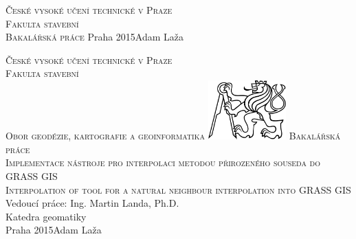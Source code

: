 \begin{center}
\newcommand{\napisCVUT}{České vysoké učení technické v Praze}
\newcommand{\napisFS}{Fakulta stavební}
\newcommand{\napisObor}{Obor geodézie, kartografie a geoinformatika}
\newcommand{\napisKatedra}{Katedra geomatiky}
\newcommand{\napisVedouci}{Vedoucí práce: Ing. Martin Landa, Ph.D.}
\newcommand{\napisAutor}{Adam Laža}
\newcommand{\napisDatum}{Praha 2015}
\newcommand{\napisNazevI}{Implementace nástroje pro interpolaci metodou přirozeného souseda do GRASS GIS}
\newcommand{\napisNazevAjI}{Interpolation of tool for a natural neighbour interpolation into GRASS GIS}
\newcommand{\napisBakalarka}{Bakalářská práce}
\newcommand{\napisPraha}{Praha 2015}
%
\newcommand{\velka}[1]{\textsc{#1}}
%
% 
\newif\ifpatitul
\patitultrue

\ifpatitul
{\Large\velka{\napisCVUT}}\\
\velka{\Large\napisFS}\\
\vfill
{\LARGE\velka{\napisBakalarka}}
\vfill
{\large\napisPraha\hfill\napisAutor}
\newpage
\fi%


{\Large\velka{\napisCVUT}}\\
{\Large\velka{\napisFS}}\\
{\Large\velka{\napisObor}}
\vfill
\includegraphics[width=3cm]{logo_cvut_cb} %
\vfill
{\Large\velka{\napisBakalarka}}\\
\Large\velka{\napisNazevI}\\
\large\velka{\napisNazevAjI}
\vfill
{\large%
\napisVedouci\\
\napisKatedra\\
\bigskip
\napisDatum\hfill\napisAutor}
\end{center}
